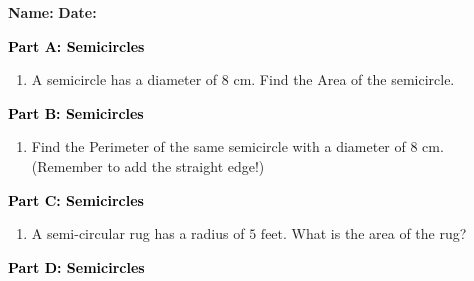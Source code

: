 \documentclass[12pt, letterpaper, fleqn]{article}
\begin{document}
\textbf{Name:} \underline{\hspace{5cm}}
\hfill
\textbf{Date:} \underline{\hspace{3cm}}\\

\begin{tcolorbox}[colback=customteal!20]
\large\textcolor{black}{\textbf{Part A: Semicircles}}
\end{tcolorbox}

\vspace{3mm}

\begin{enumerate}[itemsep=4.2cm, leftmargin=0.6cm]
\item A semicircle has a diameter of $8\text{ cm}$. Find the Area of the semicircle.
\end{enumerate}

\newpage

\begin{tcolorbox}[colback=customteal!20]
\large\textcolor{black}{\textbf{Part B: Semicircles}}
\end{tcolorbox}

\vspace{3mm}

\begin{enumerate}[itemsep=4.2cm, leftmargin=0.6cm, resume]
\item Find the Perimeter of the same semicircle with a diameter of $8\text{ cm}$. (Remember to add the straight edge!)
\end{enumerate}

\newpage

\begin{tcolorbox}[colback=customteal!20]
\large\textcolor{black}{\textbf{Part C: Semicircles}}
\end{tcolorbox}

\vspace{3mm}

\begin{enumerate}[itemsep=4.2cm, leftmargin=0.6cm, resume]
\item A semi-circular rug has a radius of $5\text{ feet}$. What is the area of the rug?
\end{enumerate}

\newpage

\begin{tcolorbox}[colback=customteal!20]
\large\textcolor{black}{\textbf{Part D: Semicircles}}
\end{tcolorbox}
\end{document}
